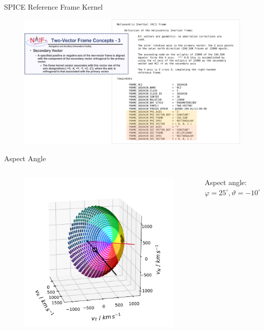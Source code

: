 \documentclass{beamer}
\begin{document}
\begin{frame}{SPICE Reference Frame Kernel}
\flushleft
\begin{figure}								
	\includegraphics[width=1.1\textwidth]{Pics/kernel_instruction.png}
\end{figure}
\end{frame}


\begin{frame}{Aspect Angle}
\begin{columns}
	\vspace{-0.8cm}
	\begin{figure}
		\includegraphics[scale=0.4]{Pics/col_aa_marker.png}
	\end{figure}
	\begin{center}
		{\small 	Aspect angle:\\
			$\varphi = 25 ^\circ, \vartheta = -10 ^\circ $}
	\end{center}
	
	\column[]{6cm}
	
	\column[]{1cm}
\end{columns}
\end{frame}

\begin{frame}{}

\end{frame}


%
%
\end{document}
